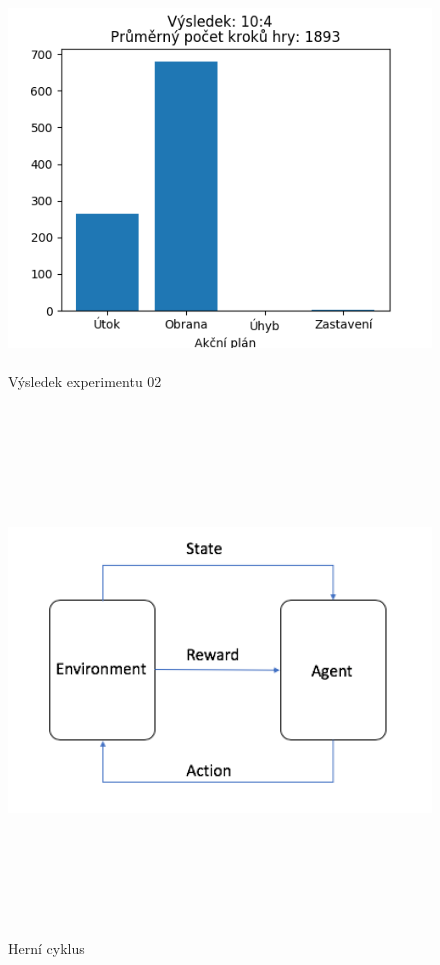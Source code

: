 \begin{figure}[p]\centering
\includegraphics[width=125mm, height=100mm]{./Obrazky/Experiment02Results.png}
\caption{Výsledek experimentu 02}
\label{obr04:Výsledek experimentu 02}
\end{figure}










\begin{figure}[p]\centering
\includegraphics[width=140mm, height=140mm]{./agent_enviroment}
\caption{Herní cyklus}
\label{obr03:Nhust}
\end{figure}
